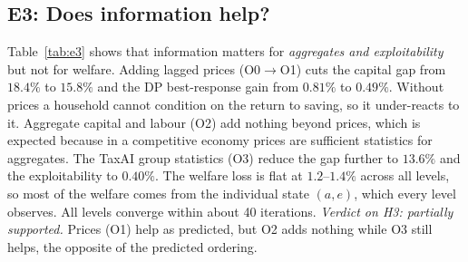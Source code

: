 \subsection{E3: Does information help?}
\begin{table}[t]
\centering\small
\caption{E3: observation levels (IPPO, $N=100$). conv.\ iter: first evaluation reaching 95\% of the final welfare
improvement.}\label{tab:e3}

\end{table}
Table~\ref{tab:e3} shows that information matters for \emph{aggregates and exploitability} but
not for welfare. Adding lagged prices (O0$\to$O1) cuts the capital gap from $18.4\%$ to $15.8\%$ and the DP best-response
gain from $0.81\%$ to $0.49\%$. Without prices a household cannot condition on the return to saving, so it
under-reacts to it. Aggregate capital and labour (O2) add nothing beyond prices, which is expected because in a
competitive economy prices are sufficient statistics for aggregates. The TaxAI group statistics (O3) reduce the gap
further to $13.6\%$ and the exploitability to $0.40\%$. The welfare loss is flat at $1.2$--$1.4\%$ across all levels,
so most of the welfare comes from the individual state $(a,e)$, which every level observes. All levels converge within
about 40 iterations. \emph{Verdict on H3: partially supported.} Prices (O1) help as predicted, but O2 adds nothing
while O3 still helps, the opposite of the predicted ordering.

